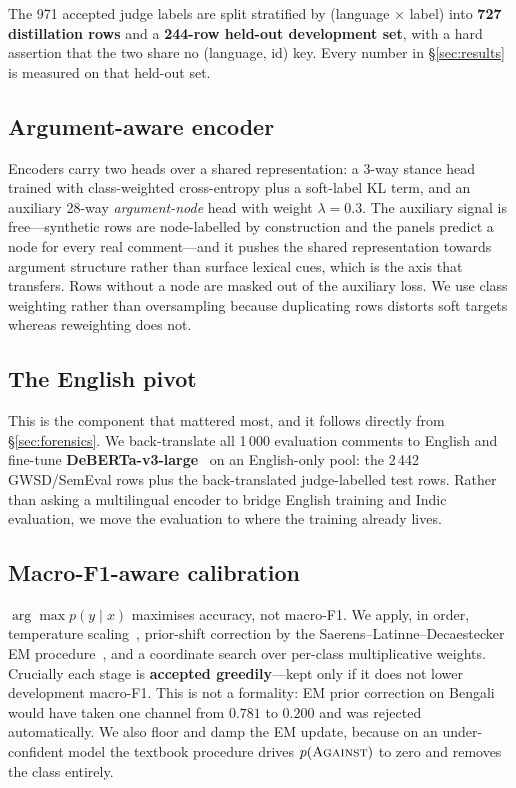 \documentclass[twocolumn]{ceurart}
\begin{document}
The 971 accepted judge labels are split stratified by
(language $\times$ label) into \textbf{727 distillation rows} and a
\textbf{244-row held-out development set}, with a hard assertion that the two
share no (language, id) key. Every number in \S\ref{sec:results} is measured on
that held-out set.

\subsection{Argument-aware encoder}
\label{sec:encoder}

Encoders carry two heads over a shared representation: a 3-way stance head
trained with class-weighted cross-entropy plus a soft-label KL term, and an
auxiliary 28-way \emph{argument-node} head with weight $\lambda = 0.3$. The
auxiliary signal is free---synthetic rows are node-labelled by construction and
the panels predict a node for every real comment---and it pushes the shared
representation towards argument structure rather than surface lexical cues,
which is the axis that transfers. Rows without a node are masked out of the
auxiliary loss. We use class weighting rather than oversampling because
duplicating rows distorts soft targets whereas reweighting does not.

\subsection{The English pivot}
\label{sec:pivot}

This is the component that mattered most, and it follows directly from
\S\ref{sec:forensics}. We back-translate all 1\,000 evaluation comments to
English and fine-tune \textbf{DeBERTa-v3-large}~\cite{he2021} on an
English-only pool: the 2\,442 GWSD/SemEval rows plus the back-translated
judge-labelled test rows. Rather than asking a multilingual encoder to bridge
English training and Indic evaluation, we move the evaluation to where the
training already lives.

\subsection{Macro-F1-aware calibration}
\label{sec:calib}

$\arg\max p(y \mid x)$ maximises accuracy, not macro-F1. We apply, in order,
temperature scaling~\cite{guo2017}, prior-shift correction by the
Saerens--Latinne--Decaestecker EM procedure~\cite{saerens2002}, and a
coordinate search over per-class multiplicative weights. Crucially each stage is
\textbf{accepted greedily}---kept only if it does not lower development
macro-F1. This is not a formality: EM prior correction on Bengali would have
taken one channel from $0.781$ to $0.200$ and was rejected automatically. We
also floor and damp the EM update, because on an under-confident model the
textbook procedure drives $p(\textsc{Against})$ to zero and removes the class
entirely.
\end{document}
